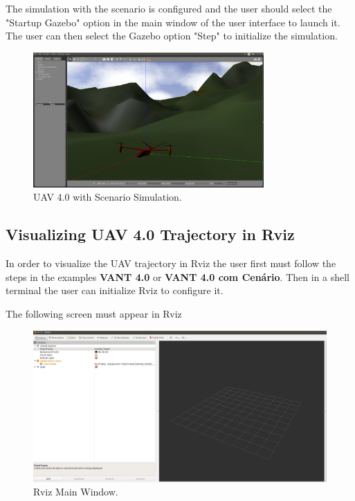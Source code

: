 	The simulation with the scenario is configured and the user should select the "Startup Gazebo" option in the main window of the user interface to launch it. The user can then select the Gazebo option "Step" to initialize the simulation.
	
	
	\begin{figure}[!ht]
		\centering
		\includegraphics[width=250pt]{figuras/cenariosim.png}
		\caption{UAV 4.0 with Scenario Simulation.}
		\label{cenariosim}
	\end{figure}
	
	\subsection{Visualizing UAV 4.0 Trajectory in Rviz}
	
	In order to visualize the UAV trajectory in Rviz the user first must follow the steps in the examples \textbf{VANT 4.0} or \textbf{VANT 4.0 com Cenário}. Then in a shell terminal the user can initialize Rviz to configure it.
	
	

		The following screen must appear in Rviz
		
		
		\begin{figure}[!ht]
			\centering
			\includegraphics[width=450pt]{figuras/rvizconfig1.png}
			\caption{Rviz Main Window.}
			\label{rvizconfig1}
		\end{figure}

